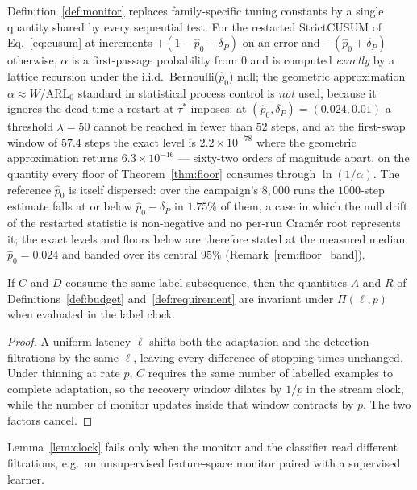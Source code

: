 Definition~\ref{def:monitor} replaces family-specific tuning constants by a
single quantity shared by every sequential test. For the restarted
StrictCUSUM of Eq.~\eqref{eq:cusum} at increments
$+(1 - \hat p_0 - \delta_P)$ on an error and $-(\hat p_0 + \delta_P)$
otherwise, $\alpha$ is a first-passage probability from $0$ and is computed
\emph{exactly} by a lattice recursion under the i.i.d.\ Bernoulli($\hat p_0$)
null; the geometric approximation $\alpha \approx W/\mathrm{ARL}_0$ standard
in statistical process control is \emph{not} used, because it ignores the
dead time a restart at $\tau^*$ imposes: at
$(\hat p_0, \delta_P) = (0.024, 0.01)$ a threshold $\lambda = 50$ cannot be
reached in fewer than $52$ steps, and at the first-swap window of
$57.4$ steps the exact level is $2.2 \times 10^{-78}$ where the geometric
approximation returns $6.3 \times 10^{-16}$ --- sixty-two orders of
magnitude apart, on the quantity every floor of
Theorem~\ref{thm:floor} consumes through $\ln(1/\alpha)$. The reference
$\hat p_0$ is itself dispersed: over the campaign's $8{,}000$ runs the
$1000$-step estimate falls at or below $\hat p_0 - \delta_P$ in $1.75\%$ of
them, a case in which the null drift of the restarted statistic is
non-negative and no per-run Cram\'er root represents it; the exact levels
and floors below are therefore stated at the measured median
$\hat p_0 = 0.024$ and banded over its central $95\%$
(Remark~\ref{rem:floor_band}).

\begin{lemma}\label{lem:clock}
  If $C$ and $D$ consume the same label subsequence, then the quantities
  $A$ and $R$ of Definitions~\ref{def:budget} and~\ref{def:requirement} are
  invariant under $\Pi(\ell, p)$ when evaluated in the label clock.
\end{lemma}

\begin{proof}
  A uniform latency $\ell$ shifts both the adaptation and the detection
  filtrations by the same $\ell$, leaving every difference of stopping times
  unchanged. Under thinning at rate $p$, $C$ requires the same number of
  labelled examples to complete adaptation, so the recovery window dilates by
  $1/p$ in the stream clock, while the number of monitor updates inside that
  window contracts by $p$. The two factors cancel.
\end{proof}

Lemma~\ref{lem:clock} fails only when the monitor and the classifier read
different filtrations, e.g.\ an unsupervised feature-space monitor paired
with a supervised learner.

